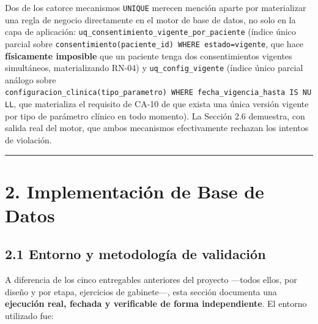 \documentclass[11pt,a4paper]{article}
\begin{document}
Dos de los catorce mecanismos \texttt{UNIQUE} merecen mención aparte por materializar una regla de negocio directamente en el motor de base de datos, no solo en la capa de aplicación: \texttt{uq\_consentimiento\_vigente\_por\_paciente} (índice único parcial sobre \texttt{consentimiento(paciente\_id)\ WHERE\ estado=\textquotesingle{}vigente\textquotesingle{}}, que hace \textbf{físicamente imposible} que un paciente tenga dos consentimientos vigentes simultáneos, materializando RN-04) y \texttt{uq\_config\_vigente} (índice único parcial análogo sobre \texttt{configuracion\_clinica(tipo\_parametro)\ WHERE\ fecha\_vigencia\_hasta\ IS\ NULL}, que materializa el requisito de CA-10 de que exista una única versión vigente por tipo de parámetro clínico en todo momento). La Sección 2.6 demuestra, con salida real del motor, que ambos mecanismos efectivamente rechazan los intentos de violación.

\begin{center}\rule{0.5\linewidth}{0.5pt}\end{center}

\section{2. Implementación de Base de Datos}\label{implementaciuxf3n-de-base-de-datos}

\subsection{2.1 Entorno y metodología de validación}\label{entorno-y-metodologuxeda-de-validaciuxf3n}

A diferencia de los cinco entregables anteriores del proyecto ---todos ellos, por diseño y por etapa, ejercicios de gabinete---, esta sección documenta una \textbf{ejecución real, fechada y verificable de forma independiente}. El entorno utilizado fue:
\end{document}
